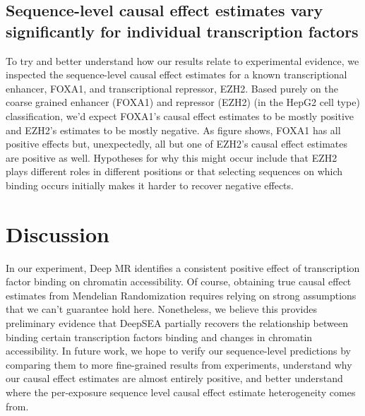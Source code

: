 \documentclass{article}
\begin{document}
\subsection*{Sequence-level causal effect estimates vary significantly for individual transcription factors}
To try and better understand how our results relate to experimental evidence, we inspected the sequence-level causal effect estimates for a known transcriptional enhancer, FOXA1, and transcriptional repressor, EZH2. Based purely on the coarse grained enhancer (FOXA1) and repressor (EZH2) (in the HepG2 cell type) classification, we'd expect FOXA1's causal effect estimates to be mostly positive and EZH2's estimates to be mostly negative. As figure  shows, FOXA1 has all positive effects but, unexpectedly, all but one of EZH2's causal effect estimates are positive as well. Hypotheses for why this might occur include that EZH2 plays different roles in different positions or that selecting sequences on which binding occurs initially makes it harder to recover negative effects.

\section{Discussion}
In our experiment, Deep MR identifies a consistent positive effect of transcription factor binding on chromatin accessibility. Of course, obtaining true causal effect estimates from Mendelian Randomization requires relying on strong assumptions that we can't guarantee hold here. Nonetheless, we believe this provides preliminary evidence that DeepSEA partially recovers the relationship between binding certain transcription factors binding and changes in chromatin accessibility. In future work, we hope to verify our sequence-level predictions by comparing them to more fine-grained results from experiments, understand why our causal effect estimates are almost entirely positive, and better understand where the per-exposure sequence level causal effect estimate heterogeneity comes from.

\clearpage



\end{document}
